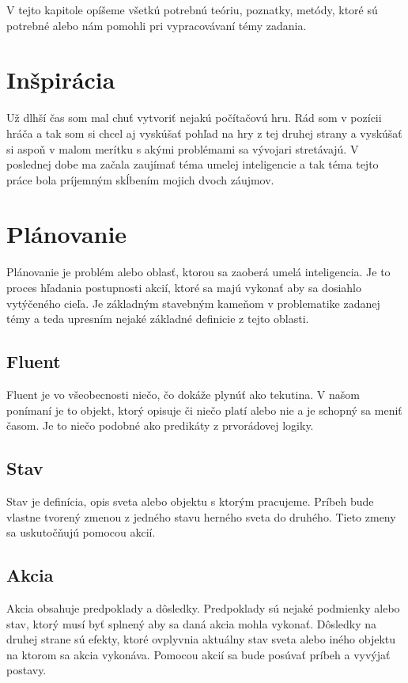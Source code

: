 V tejto kapitole opíšeme všetkú potrebnú teóriu, poznatky, metódy, ktoré sú potrebné alebo nám pomohli pri vypracovávaní témy zadania.

\section{Inšpirácia}
Už dlhší čas som mal chuť vytvoriť nejakú počítačovú hru. Rád som v pozícii hráča a tak som si chcel aj vyskúšať pohľad na hry z tej druhej strany a vyskúšať si aspoň v malom merítku s akými problémami sa vývojari stretávajú. V poslednej dobe ma začala zaujímať téma umelej inteligencie a tak téma tejto práce bola príjemným skĺbením mojich dvoch záujmov.

\section{Plánovanie}
Plánovanie je problém alebo oblasť, ktorou sa zaoberá umelá inteligencia. Je to proces hľadania postupnosti akcií, ktoré sa majú vykonať aby sa dosiahlo vytýčeného cieľa. Je základným stavebným kameňom v problematike zadanej témy a teda upresním nejaké základné definicie z tejto oblasti.
\subsection{Fluent}
Fluent je vo všeobecnosti niečo, čo dokáže plynúť ako tekutina\cite{approach}. V našom ponímaní je to objekt, ktorý opisuje či niečo platí alebo nie a je schopný sa meniť časom. Je to niečo podobné ako predikáty z prvorádovej logiky.
\subsection{Stav}
Stav je definícia, opis sveta alebo objektu s ktorým pracujeme. Príbeh bude vlastne tvorený zmenou z jedného stavu herného sveta do druhého. Tieto zmeny sa uskutočňujú pomocou akcií.
\subsection{Akcia}
Akcia obsahuje predpoklady a dôsledky. Predpoklady sú nejaké podmienky alebo stav, ktorý musí byť splnený aby sa daná akcia mohla vykonať. Dôsledky na druhej strane sú efekty, ktoré ovplyvnia aktuálny stav sveta alebo iného objektu na ktorom sa akcia vykonáva. Pomocou akcií sa bude posúvať príbeh a vyvýjať postavy.
